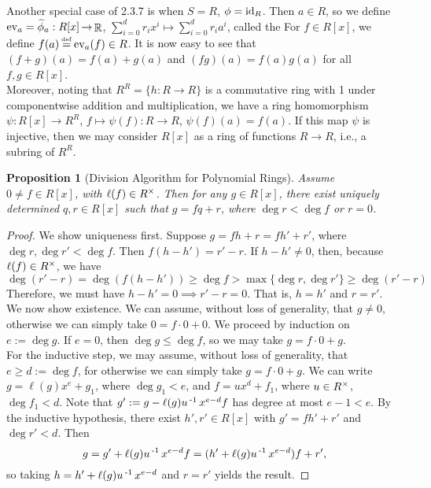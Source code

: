 \documentclass[11pt]{book}
\newcounter{counter}
\newtheorem{proposition}[counter]{Proposition}   \newtheorem{problem}[counter]{Problem}   \newtheorem*{proposition*}{Proposition}   \newtheorem*{lemma*}{Lemma}
\theoremstyle{definition}   \newtheorem{defn}[counter]{Definition} %
\newcommand\myeq{\mathrel{\overset{\makebox[0pt]{\mbox{\normalfont\tiny\sffamily \textrm{def}}}}{=}}}
\DeclareMathOperator{\R}{\mathbb{R}}   \DeclareMathOperator{\N}{\mathbb{N}}   \DeclareMathOperator{\z}{\mathbb{Z}}   \DeclareMathOperator{\Q}{\mathbb{Q}}
\DeclareMathOperator{\ra}{\rightarrow}   \DeclareMathOperator{\Poly}{\mathbf{P}}   \DeclareMathOperator{\spn}{\textnormal{span}}   \DeclareMathOperator{\aut}{\textnormal{Aut}}
\newcommand{\vs}{\vspace{8pt}}
\numberwithin{counter}{chapter}
\begin{document}
\vs

\begin{remark}[\& Definition]
Another special case of 2.3.7 is when $S=R$, $\phi = \textnormal{id}_R$. Then $a \in R$, so we define $\tn{ev}_a = \wt{\phi}_a : R[x] \ra \R$, $\sum_{i=0}^d r_i x^i \mapsto \sum_{i=0}^d r_i a^i$, called the  For $f \in R[x]$, we define $f(a) \myeq \tn{ev}_a(f) \in R$. It is now easy to see that $(f+g)(a) = f(a)+g(a)$ and $(fg)(a) = f(a)g(a)$ for all $f,g \in R[x]$. \\

Moreover, noting that $R^R = \{h : R \ra R\}$ is a commutative ring with 1 under componentwise addition and multiplication, we have a ring homomorphism $\psi : R[x] \ra R^R$, $f \mapsto \psi(f) : R \ra R$, $\psi(f)(a) = f(a)$. If this map $\psi$ is injective, then we may consider $R[x]$ as a ring of functions $R \ra R$, i.e., a subring of $R^R$.
\end{remark}

\vs

\begin{proposition}[Division Algorithm for Polynomial Rings]
Assume $0 \ne f \in R[x]$, with $\ell(f) \in R^{\times}$. Then for any $g \in R[x]$, there exist uniquely determined $q,r \in R[x]$ such that $g = fq +r$, where $\deg r < \deg f$ or $r=0$.
\end{proposition}

\begin{proof}
We show uniqueness first. Suppose $g = fh+r = fh'+r'$, where $\deg r,\deg r' < \deg f$. Then $f(h-h') = r'-r$. If $h-h' \ne 0$, then, because $\ell(f) \in R^{\times}$, we have
	\[\deg(r'-r) = \deg(f(h-h')) \geq \deg f > \max\{\deg r,\deg r'\} \geq \deg (r'-r) \]
Therefore, we must have $h-h' = 0 \implies r'-r = 0$. That is, $h=h'$ and $r=r'$. \\

We now show existence. We can assume, without loss of generality, that $g \ne 0$, otherwise we can simply take $0 = f \cdot 0 + 0$. We proceed by induction on $e := \deg g$. If $e = 0$, then $\deg g \leq \deg f$, so we may take $g = f\cdot 0 + g$. \\

For the inductive step, we may assume, without loss of generality, that $e \geq d := \deg f$, for otherwise we can simply take $g = f\cdot 0 + g$. We can write $g = \ell(g) x^e + g_1$, where $\deg g_1 < e$, and $f = ux^d + f_1$, where $u \in R^{\times}$, $\deg f_1 < d$. Note that $g' := g - \ell(g)u\operatorname{^{-1}} x^{e-d}f$ has degree at most $e-1 < e$. By the inductive hypothesis, there exist $h',r' \in R[x]$ with $g' = fh' + r'$ and $\deg r' < d$. Then
\[g = g' + \ell(g)u\operatorname{^{-1}} x^{e-d}f = (h'+\ell(g)u\operatorname{^{-1}} x^{e-d})f + r',\]
so taking $h = h'+\ell(g)u\operatorname{^{-1}} x^{e-d}$ and $r=r'$ yields the result.
\end{proof}
\end{document}
